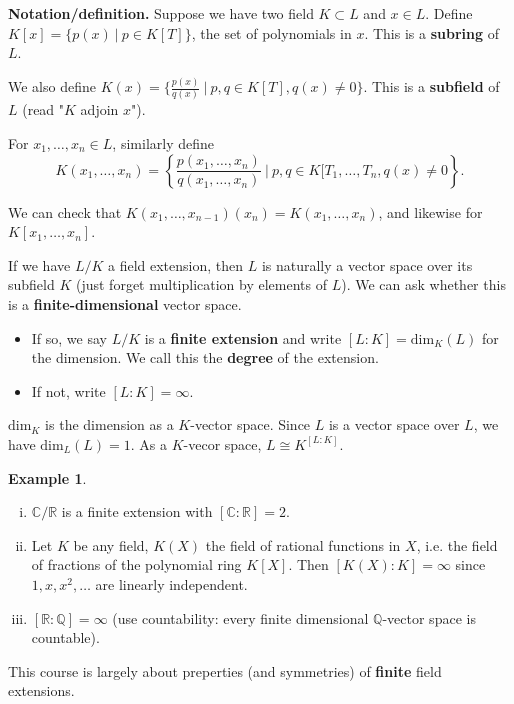 \documentclass{article}
\theoremstyle{definition}
\newtheorem{example}{Example}[section]
\begin{document}
\textbf{Notation/definition.} Suppose we have two field $K \subset L$ and $x \in L$. Define $K[x] = \{p(x) ~|~ p \in K[T]\}$, the set of polynomials in $x$. This is a \textbf{subring} of $L$.
\vspace{1mm}

We also define $K(x) = \{\frac{p(x)}{q(x)} ~|~ p,q \in K[T], q(x) \neq 0\}$. This is a \textbf{subfield} of $L$ (read "$K$ adjoin $x$").
\vspace{1mm}

For $x_1,\ldots,x_n \in L$, similarly define $$K(x_1,\ldots,x_n) = \left\{\frac{p(x_1,\ldots,x_n)}{q(x_1,\ldots,x_n)} ~|~ p,q \in K[T_1,\ldots,T_n, q(x) \neq 0\right\}.$$

We can check that $K(x_1,\ldots,x_{n-1})(x_n) = K(x_1,\ldots,x_n)$, and likewise for $K[x_1,\ldots,x_n]$.

\vspace{1mm}

If we have $L / K$ a field extension, then $L$ is naturally a vector space over its subfield $K$ (just forget multiplication by elements of $L$). We can ask whether this is a \textbf{finite-dimensional} vector space.
\begin{itemize}
    \item If so, we say $L/K$ is a \textbf{finite extension} and write $[L : K] = \text{dim}_K(L)$ for the dimension. We call this the \textbf{degree} of the extension.
    \item If not, write $[L : K] = \infty$.
\end{itemize}

$\text{dim}_K$ is the dimension as a $K$-vector space. Since $L$ is a vector space over $L$, we have $\text{dim}_L(L) = 1$. As a $K$-vecor space, $L \cong K^{[L : K]}$.

\begin{example}
    \begin{enumerate}[(i)]
        \item $\mathbb{C}/\mathbb{R}$ is a finite extension with $[\mathbb{C} : \mathbb{R}] = 2$.
        \item Let $K$ be any field, $K(X)$ the field of rational functions in $X$, i.e. the field of fractions of the polynomial ring $K[X]$. Then $[K(X) : K] = \infty$ since $1,x,x^2,\ldots$ are linearly independent.
        \item $[\mathbb{R}:\mathbb{Q}] = \infty$ (use countability: every finite dimensional $\mathbb{Q}$-vector space is countable).
    \end{enumerate}
\end{example}
This course is largely about preperties (and symmetries) of \textbf{finite} field extensions.
\end{document}
